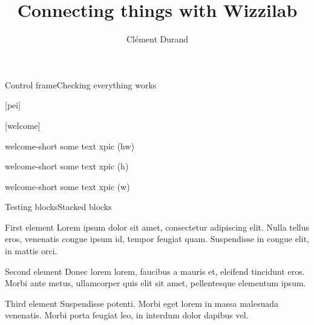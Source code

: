 \documentclass[aspectratio=169]{beamer}
\title[Stage de seconde année à l'École polytechnique]
      {Connecting things with Wizzilab}
      [Wizzilab]
\author{Clément Durand}
\begin{document}
\maketitle



\begin{frame}{Control frame}{Checking everything works}
  \lipsum[1]
\end{frame}

[pei]

[welcome]

\begin{xpic}{welcome-short}
  some text xpic (hw)
\end{xpic}



\begin{xpic}[h]{welcome-short}
  some text xpic (h)
\end{xpic}



\begin{xpic}[w]{welcome-short}
  some text xpic (w)
\end{xpic}



\begin{frame}{Testing blocks}{Stacked blocks}
  \begin{block}{First element}
    Lorem ipsum dolor sit amet, consectetur adipiscing elit. Nulla tellus eros, venenatis congue ipsum id, tempor feugiat quam. Suspendisse in congue elit, in mattis orci.
  \end{block}

  \begin{block}{Second element}
    Donec lorem lorem, faucibus a mauris et, eleifend tincidunt eros. Morbi ante metus, ullamcorper quis elit sit amet, pellentesque elementum ipsum.
  \end{block}

  \begin{block}{Third element}
    Suspendisse potenti. Morbi eget lorem in massa malesuada venenatis. Morbi porta feugiat leo, in interdum dolor dapibus vel.
  \end{block}
\end{frame}
\end{document}
